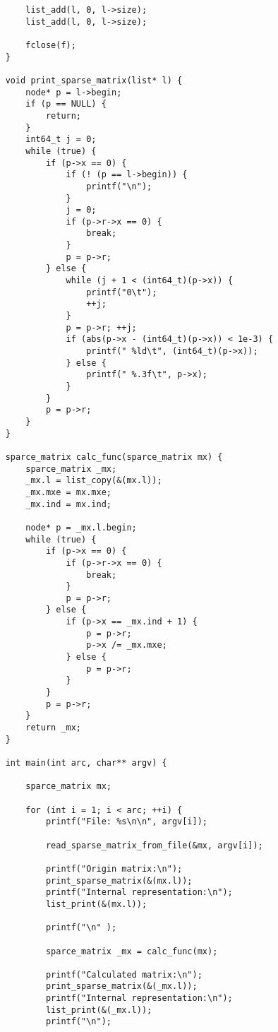 \documentclass[a4paper]{article}
\newcounter{i}
\begin{document}
\begin{enumerate}[label=\textbf{\arabic*}.]
\begin{verbatim}
        list_add(l, 0, l->size);
        list_add(l, 0, l->size);
    
        fclose(f);
    }
    
    void print_sparse_matrix(list* l) {
        node* p = l->begin;
        if (p == NULL) {
            return;
        }
        int64_t j = 0;
        while (true) {
            if (p->x == 0) {
                if (! (p == l->begin)) {
                    printf("\n"); 
                }
                j = 0;
                if (p->r->x == 0) {
                    break;
                }
                p = p->r;
            } else {
                while (j + 1 < (int64_t)(p->x)) {
                    printf("0\t");
                    ++j;
                }
                p = p->r; ++j;
                if (abs(p->x - (int64_t)(p->x)) < 1e-3) {
                    printf(" %ld\t", (int64_t)(p->x));
                } else {
                    printf(" %.3f\t", p->x);
                }
            }
            p = p->r;
        }
    }
    
    sparce_matrix calc_func(sparce_matrix mx) {
        sparce_matrix _mx;
        _mx.l = list_copy(&(mx.l));
        _mx.mxe = mx.mxe;
        _mx.ind = mx.ind;
    
        node* p = _mx.l.begin;
        while (true) {
            if (p->x == 0) {
                if (p->r->x == 0) {
                    break;
                }
                p = p->r;
            } else {
                if (p->x == _mx.ind + 1) {
                    p = p->r;
                    p->x /= _mx.mxe;
                } else {
                    p = p->r;
                }
            }
            p = p->r;
        }
        return _mx;
    }
    
    int main(int arc, char** argv) {
    
        sparce_matrix mx;
    
        for (int i = 1; i < arc; ++i) {
            printf("File: %s\n\n", argv[i]);
    
            read_sparse_matrix_from_file(&mx, argv[i]);
    
            printf("Origin matrix:\n");
            print_sparse_matrix(&(mx.l));
            printf("Internal representation:\n");
            list_print(&(mx.l));
    
            printf("\n" );
    
            sparce_matrix _mx = calc_func(mx);
    
            printf("Calculated matrix:\n");
            print_sparse_matrix(&(_mx.l));
            printf("Internal representation:\n");
            list_print(&(_mx.l));
            printf("\n");
    

\end{verbatim}
\end{enumerate}
\end{document}

